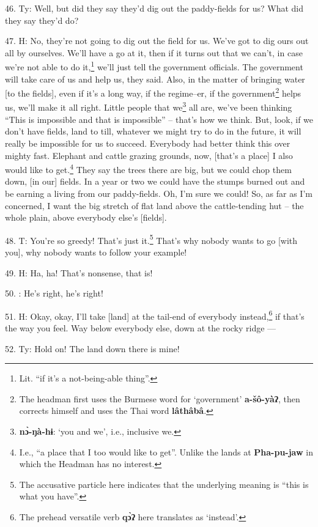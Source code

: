 46. Ty: Well, but did they say they'd dig out the paddy-fields for us? What
did they say they'd do?

47. H: No, they're not going to dig out the field for us. We've got to dig ours
out all by ourselves. We'll have a go at it, then if it turns out that we can't,
in case we're not able to do it,\footnote{Lit. ``if it's a not-being-able thing''.} we'll just tell the government officials.
The government will take care of us and help us, they said. Also, in the matter
of bringing water [to the fields], even if it's a long way, if the regime--er,
if the government\footnote{The headman first uses the Burmese word for `government' \textbf{a-šô-yàʔ}, then corrects himself and uses the Thai word \textbf{lâthâbâ}.} helps us, we'll make it all right. Little people that we\footnote{\textbf{nɔ̀-ŋà-hɨ}: `you and we', i.e., inclusive we.}
all are, we've been thinking ``This is impossible and that is impossible''
-- that's how we think. But, look, if we don't have fields, land to till, whatever
we might try to do in the future, it will really be impossible for us to succeed.
Everybody had better think this over mighty fast. Elephant and cattle grazing grounds,
now, [that's a place] I also would like to get.\footnote{I.e., ``a place that I too would like to get''. Unlike the lands at \textbf{Pha-pu-jaw} in which the Headman has no interest.} They say the trees there are
big, but we could chop them down, [in our] fields. In a year or two we could have
the stumps burned out and be earning a living from our paddy-fields. Oh, I'm sure
we could! So, as far as I'm concerned, I want the big stretch of flat land above
the cattle-tending hut -- the whole plain, above everybody else's [fields].

48. T: You're so greedy! That's just it.\footnote{The accusative particle here indicates that the underlying meaning is ``this is what you have''.} That's why nobody wants to go
[with you], why nobody wants to follow your example!

49. H: Ha, ha! That's nonsense, that is!

50. : He's right, he's right!

51. H: Okay, okay, I'll take [land] at the tail-end of everybody instead,\footnote{The prehead versatile verb \textbf{qɔ̀ʔ} here translates as `instead'.} if
that's the way you feel. Way below everybody else, down at the rocky ridge ---


52. Ty: Hold on! The land down there is mine!

